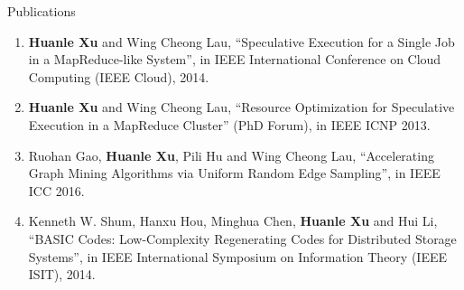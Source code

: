 \documentclass{resume} %
\begin{document}
\begin{rSection}{Publications}
\begin{enumerate}
    \item \textbf{Huanle Xu} and Wing Cheong Lau, ``Speculative Execution for a Single Job in a MapReduce-like System'', in IEEE International Conference on Cloud Computing {(IEEE Cloud)}, 2014.
    \item \textbf{Huanle Xu} and Wing Cheong Lau, ``Resource Optimization for Speculative Execution in a MapReduce Cluster'' (PhD Forum), in {IEEE ICNP} 2013.
     \item Ruohan Gao, \textbf{Huanle Xu}, Pili Hu and Wing Cheong Lau, ``Accelerating Graph Mining Algorithms via Uniform Random Edge Sampling'', in {IEEE ICC} 2016. 
     \item Kenneth W. Shum, Hanxu Hou, Minghua Chen, \textbf{Huanle Xu} and Hui Li, ``BASIC Codes: Low-Complexity Regenerating Codes for Distributed Storage Systems'', in IEEE International Symposium on Information Theory (IEEE ISIT), 2014.
\end{enumerate}



\end{rSection}


\end{document}
